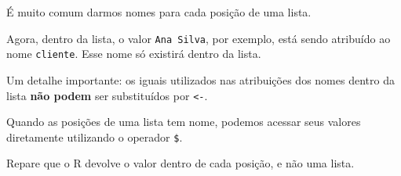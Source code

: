 \documentclass[]{book}
\newenvironment{Shaded}{\begin{snugshade}}{\end{snugshade}}
\newcommand{\CommentTok}[1]{\textcolor[rgb]{0.56,0.35,0.01}{\textit{#1}}}
\newcommand{\DataTypeTok}[1]{\textcolor[rgb]{0.13,0.29,0.53}{#1}}
\newcommand{\DecValTok}[1]{\textcolor[rgb]{0.00,0.00,0.81}{#1}}
\newcommand{\KeywordTok}[1]{\textcolor[rgb]{0.13,0.29,0.53}{\textbf{#1}}}
\newcommand{\NormalTok}[1]{#1}
\newcommand{\OperatorTok}[1]{\textcolor[rgb]{0.81,0.36,0.00}{\textbf{#1}}}
\newcommand{\OtherTok}[1]{\textcolor[rgb]{0.56,0.35,0.01}{#1}}
\newcommand{\StringTok}[1]{\textcolor[rgb]{0.31,0.60,0.02}{#1}}
\begin{document}
É muito comum darmos nomes para cada posição de uma lista.

\begin{Shaded}
\end{Shaded}

Agora, dentro da lista, o valor \texttt{Ana\ Silva}, por exemplo, está sendo atribuído ao nome \texttt{cliente}. Esse nome só existirá dentro da lista.

Um detalhe importante: os iguais utilizados nas atribuições dos nomes dentro da lista \textbf{não podem} ser substituídos por \texttt{\textless{}-}.

Quando as posições de uma lista tem nome, podemos acessar seus valores diretamente utilizando o operador \texttt{\$}.

\begin{Shaded}
\end{Shaded}

Repare que o R devolve o valor dentro de cada posição, e não uma lista.

\begin{Shaded}
\end{Shaded}
\end{document}
